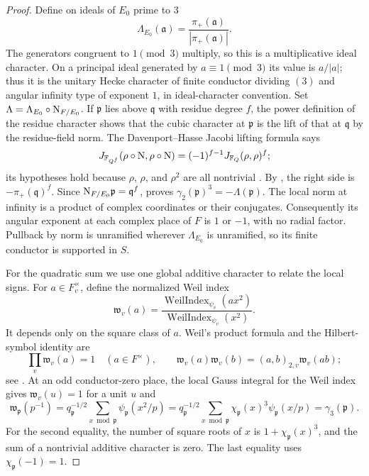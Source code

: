 \begin{proof}
Define on ideals of \(E_0\) prime to \(3\)
\[
 \Lambda_{E_0}(\mathfrak a)
     =\frac{\pi_+(\mathfrak a)}{|\pi_+(\mathfrak a)|}.
\]
The generators congruent to \(1\pmod3\) multiply, so this is a
multiplicative ideal character.  On a principal ideal generated by
\(a\equiv1\pmod3\) its value is \(a/|a|\); thus it is the unitary Hecke
character of finite conductor dividing \((3)\) and angular infinity type
of exponent \(1\), in ideal-character convention.  Set
\(\Lambda=\Lambda_{E_0}\circ\mathrm{N}_{F/E_0}\).
If \(\mathfrak p\) lies above \(\mathfrak q\) with residue degree \(f\),
the power definition of the residue character shows that the cubic
character at \(\mathfrak p\) is the lift of that at \(\mathfrak q\) by
the residue-field norm.  The Davenport--Hasse Jacobi lifting formula says
\[
 J_{\mathbb{F}_{Q^f}}(\rho\circ\mathrm{N},\rho\circ\mathrm{N})
       =(-1)^{f-1}J_{\mathbb{F}_Q}(\rho,\rho)^f;
\]
its hypotheses hold because \(\rho\), \(\rho\), and \(\rho^2\) are all
nontrivial \cite[Theorem~1.1]{HoshiKanai22}.  By
, the right side is
\(-\pi_+(\mathfrak q)^f\).  Since
\(\mathrm{N}_{F/E_0}\mathfrak p=\mathfrak q^f\),
 proves
\(\gamma_2(\mathfrak p)^3=-\Lambda(\mathfrak p)\).
The local norm at infinity is a product of complex coordinates or their
conjugates.  Consequently its angular exponent at each complex place of
\(F\) is \(1\) or \(-1\), with no radial factor.  Pullback by norm is
unramified wherever \(\Lambda_{E_0}\) is unramified, so its finite conductor
is supported in \(S\).

For the quadratic sum we use one global additive character to relate the
local signs.  For \(a\in F_v^\times\), define the normalized Weil index
\[
 \mathfrak w_v(a)=
 \frac{\operatorname{WeilIndex}_{\psi_v}(a x^2)}
      {\operatorname{WeilIndex}_{\psi_v}(x^2)}.
\]
It depends only on the square class of \(a\).  Weil's product formula and
the Hilbert-symbol identity are
\begin{equation}
 \prod_v\mathfrak w_v(a)=1\quad(a\in F^\times),\qquad
 \mathfrak w_v(a)\mathfrak w_v(b)
       =(a,b)_{2,v}\mathfrak w_v(ab);
\label{eq:weil-index}
\end{equation}
see \cite[Chapter~II, \S28 and Proposition~5 in \S30]{Weil64}.
At an odd conductor-zero place, the local Gauss integral for the Weil index
\cite[Chapter~II, \S27]{Weil64} gives \(\mathfrak w_v(u)=1\) for a unit \(u\)
and
\[
 \mathfrak w_{\mathfrak p}(p^{-1})
  =q_{\mathfrak p}^{-1/2}
       \sum_{x\bmod\mathfrak p}\psi_{\mathfrak p}(x^2/p)
  =q_{\mathfrak p}^{-1/2}
       \sum_{x\bmod\mathfrak p}
          \chi_{\mathfrak p}(x)^3\psi_{\mathfrak p}(x/p)
  =\gamma_3(\mathfrak p).
\]
For the second equality, the number of square roots of \(x\) is
\(1+\chi_{\mathfrak p}(x)^3\), and the sum of a nontrivial additive
character is zero.  The last equality uses
\(\chi_{\mathfrak p}(-1)=1\).


\end{proof}
